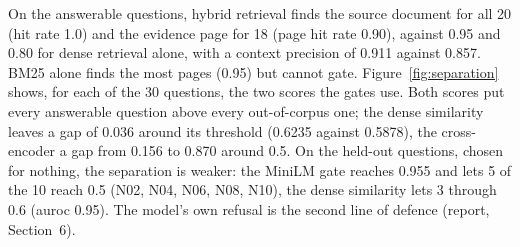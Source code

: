 On the answerable questions, hybrid retrieval finds the source document for all 20 (hit rate 1.0)
and the evidence page for 18 (page hit rate 0.90), against 0.95 and 0.80 for dense retrieval
alone, with a context precision of 0.911 against 0.857. BM25 alone finds the most pages (0.95) but
cannot gate. Figure~\ref{fig:separation} shows, for each of the 30 questions, the two scores the
gates use. Both scores put every answerable question above every out-of-corpus one; the dense
similarity leaves a gap of 0.036 around its threshold (0.6235 against 0.5878), the cross-encoder a
gap from 0.156 to 0.870 around 0.5. On the held-out questions, chosen for nothing, the separation
is weaker: the MiniLM gate reaches  0.955 and lets 5 of the 10 reach 0.5
(N02, N04, N06, N08, N10), the dense similarity lets 3 through 0.6 (auroc 0.95). The model's own
refusal is the second line of defence (report, Section~6).


